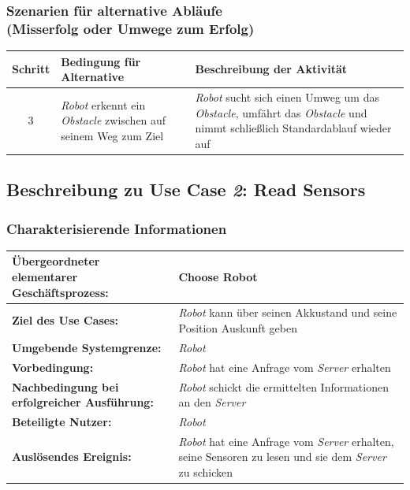 \documentclass[includeheaders]{scrartcl}
\begin{document}
			\subsubsection*{Szenarien für alternative Abläufe\\ (Misserfolg oder Umwege zum Erfolg)}

			\begin{table}[H]
				\centering
				\begin{tabularx}{\textwidth}{@{}cp{6cm}X@{}}
				\toprule
				Schritt & Bedingung für Alternative & Beschreibung der Aktivität \\ \midrule
				3 & \emph{Robot} erkennt ein \emph{Obstacle} zwischen auf seinem Weg zum Ziel & \emph{Robot} sucht sich einen Umweg um das \emph{Obstacle}, umfährt das \emph{Obstacle} und nimmt schließlich Standardablauf wieder auf \\
				\bottomrule
				\end{tabularx}
			\end{table}


		\subsection{Beschreibung zu Use Case \emph{2}: Read Sensors}

			\subsubsection*{Charakterisierende Informationen}

			\begin{table}[H]
				\centering
				\begin{tabularx}{\textwidth}{@{}p{5cm}X@{}}
				\toprule
				\textbf{Übergeordneter elementarer Geschäftsprozess:} & Choose Robot\\ \midrule
				\textbf{Ziel des Use Cases:} & \emph{Robot} kann über seinen Akkustand und seine Position Auskunft geben\\ \midrule
				\textbf{Umgebende Systemgrenze:} & \emph{Robot} \\ \midrule
				\textbf{Vorbedingung:} & \emph{Robot} hat eine Anfrage vom \emph{Server} erhalten \\ \midrule
				\textbf{Nachbedingung bei erfolgreicher Ausführung:} & \emph{Robot} schickt die ermittelten Informationen an den \emph{Server} \\ \midrule
				\textbf{Beteiligte Nutzer:} & \emph{Robot} \\ \midrule
				\textbf{Auslösendes Ereignis:} & \emph{Robot} hat eine Anfrage vom \emph{Server} erhalten, seine Sensoren zu lesen und sie dem \emph{Server} zu schicken \\
				\bottomrule
				\end{tabularx}
			\end{table}
\end{document}
